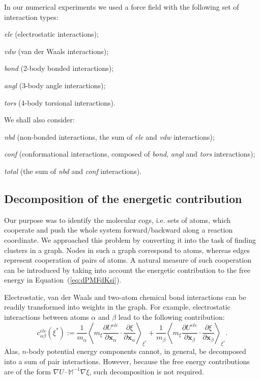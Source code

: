 \documentclass[a4paper,11pt,twoside]{book}%
\begin{document}
In our numerical experiments we used a force field with the following set of interaction types:
\begin{packeditemize}
 \item \emph{ele} (electrostatic interactions);
 \item \emph{vdw} (van der Waals interactions);
 \item \emph{bond} (2-body bonded interactions);
 \item \emph{angl} (3-body angle interactions);
 \item \emph{tors} (4-body torsional interactions).
\end{packeditemize}
We shall also consider:
\begin{packeditemize} 
 \item \emph{nbd} (non-bonded interactions, the sum of \emph{ele} and \emph{vdw} interactions);
 \item \emph{conf} (conformational interactions, composed of \emph{bond}, \emph{angl} and \emph{tors} interactions);
 \item \emph{total} (the sum of \emph{nbd} and \emph{conf} interactions).
\end{packeditemize}

\subsection{Decomposition of the energetic contribution}\label{sec:decomposition}
Our purpose was to identify the molecular cogs{\color{black}, i.e.} sets of atoms, which cooperate and push the whole system forward/backward along a reaction coordinate.
We approached this problem by converting it {\color{black}in}to the task of finding clusters in a graph.
Nodes in such a graph correspond to atoms, whereas edges represent cooperation of pairs of atoms.
A natural measure of such cooperation can be introduced by taking into account the energetic contribution to the free energy in Equation~(\ref{eq:dPMFdKsi}).

Electrostatic, van der Waals and two-atom chemical bond interactions can be readily transformed into weights in the graph.
For example, electrostatic interactions between atoms $\alpha$ and $\beta$ lead to the following contribution:
\begin{equation}
c_{\alpha\beta}^{ele}(\xi^*):= \frac{1}{m_\alpha} \left\langle m_\xi \frac{\partial U^{ele}}{\partial \mathbf{x}_\alpha}\cdot\frac{\partial\xi}{\partial\mathbf{x}_\alpha} \right\rangle_{\xi^*}  + \frac{1}{m_\beta} \left\langle m_\xi \frac{\partial U^{ele}}{\partial \mathbf{x}_\beta}\cdot\frac{\partial\xi}{\partial\mathbf{x}_\beta} \right \rangle_{\xi^*} .
\end{equation}
Alas, $n$-body potential energy components cannot, in general, be decomposed into a sum of pair interactions.
However, because the free energy contributions are of the form $\nabla U\cdot\mathbb{M}^{-1}\nabla\xi$, such decomposition is not required.
\end{document}
